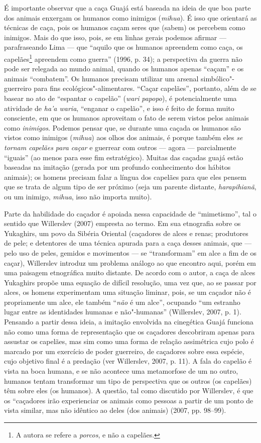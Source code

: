 É importante observar que a caça Guajá está baseada na ideia de que boa
parte dos animais enxergam os humanos como inimigos (\emph{mihua}). É
isso que orientará as técnicas de caça, pois os humanos caçam seres que
(sabem) os percebem como inimigos. Mais do que isso, pois, se em linhas
gerais podemos afirmar --- parafraseando Lima --- que ``aquilo que os humanos
apreendem como caça, os capelães\footnote{A autora se refere a
  \emph{porcos}, e não a capelães.} apreendem como guerra'' (1996, p.
34); a perspectiva da guerra não pode ser relegada ao mundo animal,
quando os humanos apenas ``caçam'' e os animais ``combatem''. Os humanos
precisam utilizar um arsenal simbólico"-guerreiro para fins
ecológicos"-alimentares. ``Caçar capelães'', portanto, além de se basear no
ato de ``espantar o capelão'' (\emph{wari} \emph{papopo}), é
potencialmente uma atividade de \emph{ha'a waria}, ``enganar o capelão'',
e isso é feito de forma muito consciente, em que os humanos aproveitam o
fato de serem vistos pelos animais como \emph{inimigos}. Podemos pensar
que, se durante uma caçada os humanos são vistos como inimigos
(\emph{mihua}) aos olhos dos animais, é porque também eles \emph{se
tornam capelães para caçar} e guerrear com outros --- agora --- parcialmente
``iguais'' (ao menos para esse fim estratégico). Muitas das caçadas
guajá estão baseadas na imitação (gerada por um profundo conhecimento
dos hábitos animais); os homens precisam falar a língua dos capelães
para que eles pensem que se trata de algum tipo de ser próximo (seja um
parente distante, \emph{harapihianã}, ou um inimigo, \emph{mihua}, isso
não importa muito).

Parte da habilidade do caçador é apoiada nessa capacidade de
``mimetismo'', tal o sentido que Willerslev (2007) empresta ao termo. Em
sua etnografia sobre os Yukaghirs, um povo da Sibéria Oriental
(caçadores de alces e renas; produtores de pele; e detentores de uma
técnica apurada para a caça desses animais, que --- pelo uso de peles,
gemidos e movimentos --- se ``transformam'' em alce a fim de os caçar),
Willerslev introduz um problema análogo ao que encontro aqui, porém em
uma paisagem etnográfica muito distante. De acordo com o autor, a caça
de alces Yukaghirs propõe uma equação de difícil resolução, uma vez que,
ao se passar por alces, os homens experimentam uma situação liminar,
pois, se um caçador não é propriamente um alce, ele também ``\emph{não} é
um alce'', ocupando ``um estranho lugar entre as identidades humanas e
não"-humanas'' (Willerslev, 2007, p. 1). Pensando a partir dessa ideia, a
imitação envolvida na cinegética Guajá funciona não como uma forma de
representação que os caçadores descobriram apenas para assustar os
capelães, mas sim como uma forma de relação assimétrica cujo polo é
marcado por um exercício de poder guerreiro, de caçadores sobre essa
espécie, cujo objetivo final é a predação (ver Willerslev, 2007, p. 11).
A fala do capelão é vista na boca humana, e se não acontece uma
metamorfose de um no outro, humanos tentam transformar um tipo de
perspectiva que os outros (os capelães) têm sobre eles (os humanos). A
questão, tal como discutido por Willerslev, é que os ``caçadores irão
experienciar os animais como pessoas a partir de um ponto de vista
similar, mas não idêntico ao deles (dos animais) (2007, pp. 98--99).

